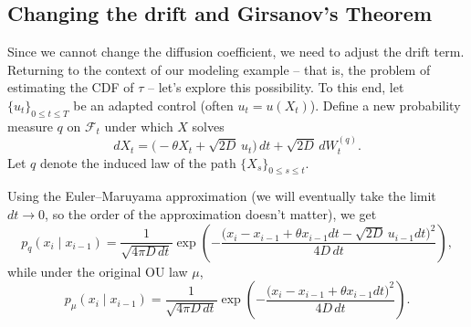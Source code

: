 \documentclass[11pt]{article}
\begin{document}
 \subsection*{Changing the drift and Girsanov's Theorem}
Since we cannot change the diffusion coefficient, we need to adjust the drift term. Returning to the context of our modeling example -- that is, the problem of estimating the CDF of $\tau$ -- let's explore this possibility.  
To this end, let $\{u_t\}_{0\le t\le T}$ be an adapted control (often $u_t=u(X_t)$). Define a new probability measure $q$ on ${\mathcal F}_t$ under which $X$ solves
\begin{equation}
dX_t
=
\Big(-\theta X_t + \sqrt{2D}\,u_t\Big)\,dt
+
\sqrt{2D}\,dW_t^{(q)}.
\end{equation}
Let $q$ denote the induced law of the path $\{X_s\}_{0\le s\le t}$.



Using the Euler--Maruyama approximation (we will eventually take the limit $dt \to 0$, so the order of the approximation doesn't matter), we get
\begin{equation}
p_q(x_i\mid x_{i-1})
=
\frac{1}{\sqrt{4\pi D\,dt}}
\exp\!\left(
-\frac{\big(x_i - x_{i-1} + \theta x_{i-1}dt - \sqrt{2D}\,u_{i-1}dt\big)^2}{4D\,dt}
\right),
\end{equation}
while under the original OU law $\mu$,
\begin{equation}
p_{\mu}(x_i\mid x_{i-1})
=
\frac{1}{\sqrt{4\pi D\,dt}}
\exp\!\left(
-\frac{\big(x_i - x_{i-1} + \theta x_{i-1}dt \big)^2}{4D\,dt}
\right).
\end{equation}
\end{document}
